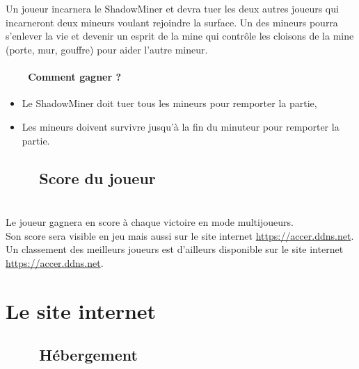 \documentclass[titlepage, 13px, a4paper]{report}
\begin{document}
\paragraph{} \hspace{0pt} \\
Un joueur incarnera le ShadowMiner et devra tuer les deux autres joueurs qui 
incarneront deux mineurs voulant rejoindre la surface. Un des mineurs pourra 
s’enlever la vie et devenir un esprit de la mine qui contrôle les cloisons de 
la mine (porte, mur, gouffre) pour aider l’autre mineur. \\

\paragraph{~~~~Comment gagner ?} \hspace{0pt}
{\begin{itemize}
	\item Le ShadowMiner doit tuer tous les mineurs pour remporter la partie,
	\item Les mineurs doivent survivre jusqu’à la fin du minuteur pour remporter la partie. \\
\end{itemize}}

\subsection[Score du joueur]{~~~~Score du joueur}
\paragraph{} \hspace{0pt} \\
Le joueur gagnera en score à chaque victoire en mode multijoueurs. \\
Son score sera visible en jeu mais aussi sur le site internet \url{https://accer.ddns.net}. \\
Un classement des meilleurs joueurs est d’ailleurs disponible sur le site internet \url{https://accer.ddns.net}. \\


\newpage

\section{Le site internet}
\subsection[Hébergement]{~~~~Hébergement}
\end{document}
